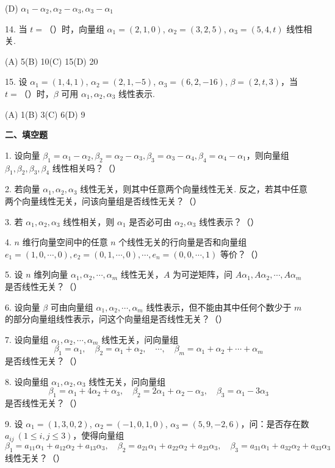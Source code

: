 \documentclass[UTF8, 12pt, fontset=fandol, oneside]{ctexart}
\begin{document}
(D) $\alpha_1-\alpha_2,\alpha_2-\alpha_3,\alpha_3-\alpha_1$

14. 当 $t=$（\quad）时，向量组 $\alpha_1=(2,1,0)$, $\alpha_2=(3,2,5)$, $\alpha_3=(5,4,t)$ 线性相关.

(A) 5\qquad (B) 10\qquad (C) 15\qquad (D) 20

15. 设 $\alpha_1=(1,4,1)$, $\alpha_2=(2,1,-5)$, $\alpha_3=(6,2,-16)$, $\beta=(2,t,3)$，当 $t=$（\quad）时，$\beta$ 可用 $\alpha_1,\alpha_2,\alpha_3$ 线性表示.

(A) 1\qquad (B) 3\qquad (C) 6\qquad (D) 9

\noindent\textbf{二、填空题}

1. 设向量 $\beta_1=\alpha_1-\alpha_2,\beta_2=\alpha_2-\alpha_3,\beta_3=\alpha_3-\alpha_4,\beta_4=\alpha_4-\alpha_1$，则向量组 $\beta_1,\beta_2,\beta_3,\beta_4$ 线性相关吗？（\quad）

2. 若向量 $\alpha_1,\alpha_2,\alpha_3$ 线性无关，则其中任意两个向量线性无关. 反之，若其中任意两个向量线性无关，问该向量组是否线性无关？（\quad）

3. 若 $\alpha_1,\alpha_2,\alpha_3$ 线性相关，则 $\alpha_1$ 是否必可由 $\alpha_2,\alpha_3$ 线性表示？（\quad）

4. $n$ 维行向量空间中的任意 $n$ 个线性无关的行向量是否和向量组 $e_1=(1,0,\cdots,0),e_2=(0,1,\cdots,0),\cdots,e_n=(0,0,\cdots,1)$ 等价？（\quad）

5. 设 $n$ 维列向量 $\alpha_1,\alpha_2,\cdots,\alpha_m$ 线性无关，$A$ 为可逆矩阵，问 $A\alpha_1,A\alpha_2,\cdots,A\alpha_m$ 是否线性无关？（\quad）

6. 设向量 $\beta$ 可由向量组 $\alpha_1,\alpha_2,\cdots,\alpha_m$ 线性表示，但不能由其中任何个数少于 $m$ 的部分向量组线性表示，问这个向量组是否线性无关？（\quad）

7. 设向量组 $\alpha_1,\alpha_2,\cdots,\alpha_m$ 线性无关，问向量组
\[
\beta_1=\alpha_1,\quad \beta_2=\alpha_1+\alpha_2,\quad \cdots,\quad \beta_m=\alpha_1+\alpha_2+\cdots+\alpha_m
\]
是否线性无关？（\quad）

8. 设向量组 $\alpha_1,\alpha_2,\alpha_3$ 线性无关，问向量组
\[
\beta_1=\alpha_1+4\alpha_2+\alpha_3,\quad \beta_2=2\alpha_1+\alpha_2-\alpha_3,\quad \beta_3=\alpha_1-3\alpha_3
\]
是否线性无关？（\quad）

9. 设 $\alpha_1=(1,3,0,2)$, $\alpha_2=(-1,0,1,0)$, $\alpha_3=(5,9,-2,6)$，问：是否存在数 $a_{ij}\ (1\le i,j\le 3)$，使得向量组
\[
\beta_1=a_{11}\alpha_1+a_{12}\alpha_2+a_{13}\alpha_3,\quad
\beta_2=a_{21}\alpha_1+a_{22}\alpha_2+a_{23}\alpha_3,\quad
\beta_3=a_{31}\alpha_1+a_{32}\alpha_2+a_{33}\alpha_3
\]
线性无关？（\quad）
\end{document}
